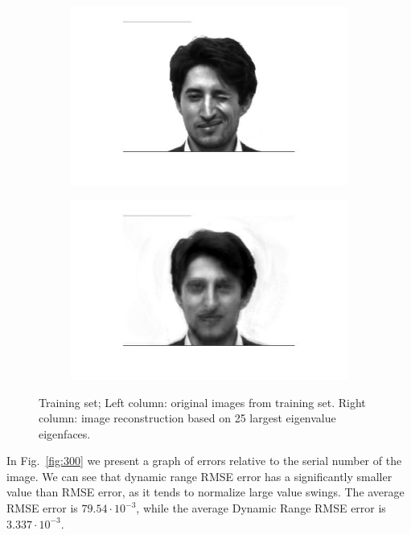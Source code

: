 \documentclass[a4paper]{iacas}
\begin{document}
\begin{figure}[!htbp]
	\begin{subfigure}[b]{0.4\textwidth}
		\includegraphics[width=\textwidth]{3302.jpg}
		\caption{}
		\label{fig:3302}
	\end{subfigure}
	\begin{subfigure}[b]{0.4\textwidth}
		\includegraphics[width=\textwidth]{3301.jpg}
		\caption{}
		\label{fig:3301}
	\end{subfigure}
	
	\caption{Training set; Left column: original images from training set. Right column: image reconstruction based on 25 largest eigenvalue eigenfaces.}
	\label{fig:3000}
\end{figure}

In Fig.~\ref{fig:300} we present a graph of errors relative to the serial number of the image. We can see that dynamic range RMSE error has a significantly smaller value than RMSE error, as it tends to normalize large value swings. The average RMSE error is $79.54 \cdot 10^{-3}$, while the average Dynamic Range RMSE error is $3.337 \cdot 10^{-3}$.
\end{document}

